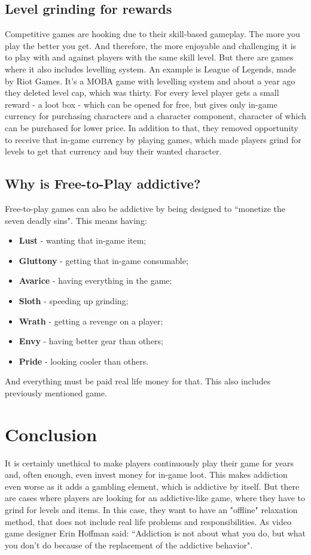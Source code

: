 \documentclass{scrartcl}
\begin{document}
\subsection{Level grinding for rewards}
Competitive games are hooking due to their skill-based gameplay. The more you play the better you get. And therefore, the more enjoyable and challenging it is to play with and against players with the same skill level. But there are games where it also includes levelling system. An example is League of Legends, made by Riot Games. It's a MOBA game with levelling system and about a year ago they deleted level cap, which was thirty. For every level player gets a small reward - a loot box - which can be opened for free, but gives only in-game currency for purchasing characters and a character component, character of which can be purchased for lower price. In addition to that, they removed opportunity to receive that in-game currency by playing games, which made players grind for levels to get that currency and buy their wanted character.

\subsection{Why is Free-to-Play addictive?}
Free-to-play games can also be addictive by being designed to ``monetize the seven deadly sins"\cite{vgaddiction}. This means having:

\begin{itemize}
	\item \textbf{Lust} - wanting that in-game item;
	\item \textbf{Gluttony} - getting that in-game consumable;
	\item \textbf{Avarice} - having everything in the game;
	\item \textbf{Sloth} - speeding up grinding;
	\item \textbf{Wrath} - getting a revenge on a player;
	\item \textbf{Envy} - having better gear than others;
	\item \textbf{Pride} - looking cooler than others.
\end{itemize}
And everything must be paid real life money for that. This also includes previously mentioned game. 

\section{Conclusion}

It is certainly unethical to make players continuously play their game for years and, often enough, even invest money for in-game loot. This makes addiction even worse as it adds a gambling element, which is addictive by itself. But there are cases where players are looking for an addictive-like game, where they have to grind for levels and items. In this case, they want to have an "offline" relaxation method, that does not include real life problems and responsibilities. As video game designer Erin Hoffman said: ``Addiction is not about what you do, but what you don't do because of the replacement of the addictive behavior"\cite{addictivegamemechs}.



\end{document}
